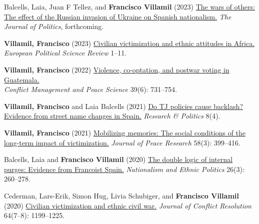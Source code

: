 \documentclass[a4paper, 12pt]{article}
\begin{document}
\begin{etaremune}[leftmargin=12pt, itemsep=0pt]
\item Balcells, Laia, Juan F Tellez, and \textbf{Francisco Villamil} (2023) \href{https://www.laiabalcells.com/wp-content/uploads/Ukraine_and_Spanish_Nationalism.pdf}{The wars of others: The effect of the Russian invasion of Ukraine on Spanish nationalism.} \textit{The Journal of Politics}, forthcoming.
\item \textbf{Villamil, Francisco} (2023) \href{https://doi.org/10.1017/S1755773923000097}{Civilian victimization and ethnic attitudes in Africa.}\\\textit{European Political Science Review} 1--11.
\item \textbf{Villamil, Francisco} (2022) \href{https://journals.sagepub.com/doi/full/10.1177/07388942211066539}{Violence, co-optation, and postwar voting in Guatemala.}\\\textit{Conflict Management and Peace Science} 39(6): 731--754.
\item \textbf{Villamil, Francisco} and Laia Balcells (2021) \href{https://journals.sagepub.com/doi/full/10.1177/20531680211058550}{Do TJ policies cause backlash? Evidence from street name changes in Spain.} \textit{Research \& Politics} 8(4).
\item \textbf{Villamil, Francisco} (2021) \href{https://doi.org/10.1177/0022343320912816}{Mobilizing memories: The social conditions of the long-term impact of victimization.} \textit{Journal of Peace Research} 58(3): 399--416.
\item Balcells, Laia and \textbf{Francisco Villamil} (2020) \href{https://doi.org/10.1080/13537113.2020.1795451}{The double logic of internal purges: Evidence from Francoist Spain.} \textit{Nationalism and Ethnic Politics} 26(3): 260--278.
\item Cederman, Lars-Erik, Simon Hug, Livia Schubiger, and \textbf{Francisco Villamil} (2020) \href{https://doi.org/10.1177/0022002719898873}{Civilian victimization and ethnic civil war.} \textit{Journal of Conflict Resolution} 64(7--8): 1199--1225.
\end{etaremune}
\end{document}
